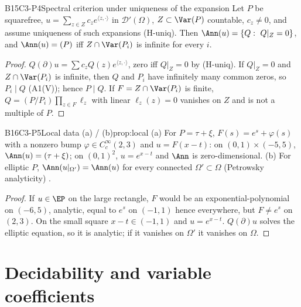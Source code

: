 \begin{dimcard}{B15}{C3-P4}{Spectral criterion under uniqueness of the expansion}{\pw}{}
Let $P$ be squarefree, $u=\sum_{z\in Z}c_ze^{\langle z,\cdot\rangle}$ in $\mathcal D'(\Omega)$, $Z\subset\Var(P)$ countable, $c_z\ne0$, and assume uniqueness of such expansions (H-uniq). Then $\Ann(u)=\{Q:\ Q|_Z=0\}$, and $\Ann(u)=(P)$ iff $Z\cap\Var(P_i)$ is infinite for every $i$.
\end{dimcard}
\begin{proof}
$Q(\partial)u=\sum c_zQ(z)e^{\langle z,\cdot\rangle}$, zero iff $Q|_Z=0$ by (H-uniq).
If $Q|_Z=0$ and $Z\cap\Var(P_i)$ is infinite, then $Q$ and $P_i$ have infinitely many common zeros, so $P_i\mid Q$ (A1(V)); hence $P\mid Q$.
If $F=Z\cap\Var(P_i)$ is finite, $Q=(P/P_i)\prod_{z\in F}\ell_z$ with linear $\ell_z(z)=0$ vanishes on $Z$ and is not a multiple of $P$.
\end{proof}

\begin{dimcard}{B16}{C3-P5}{Local data}{\pw{} (a) / \cf{} (b)}{prop:local}
(a) For $P=\tau+\xi$, $F(s)=e^s+\varphi(s)$ with a nonzero bump $\varphi\in C_c^\infty(2,3)$ and $u=F(x-t)$: on $(0,1)\times(-5,5)$, $\Ann(u)=(\tau+\xi)$; on $(0,1)^2$, $u=e^{x-t}$ and $\Ann$ is zero-dimensional. (b) For elliptic $P$, $\Ann(u|_{\Omega'})=\Ann(u)$ for every connected $\Omega'\subset\Omega$ (Petrowsky analyticity) \cf.
\end{dimcard}
\begin{proof}
If $u\in\EP$ on the large rectangle, $F$ would be an exponential-polynomial on $(-6,5)$, analytic, equal to $e^s$ on $(-1,1)$ hence everywhere, but $F\ne e^s$ on $(2,3)$. On the small square $x-t\in(-1,1)$ and $u=e^{x-t}$.
$Q(\partial)u$ solves the elliptic equation, so it is analytic; if it vanishes on $\Omega'$ it vanishes on $\Omega$.
\end{proof}

\section{Decidability and variable coefficients}

